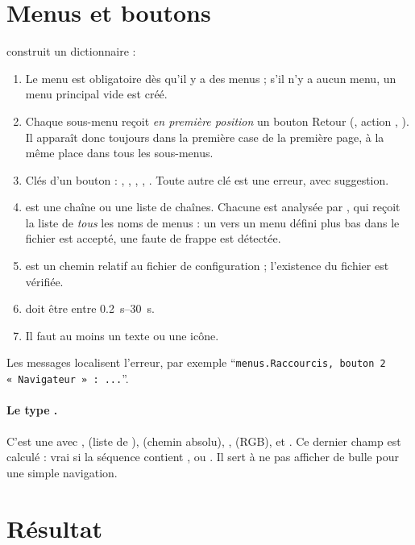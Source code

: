 \section{Menus et boutons}

 construit un dictionnaire  :
\begin{enumerate}
  \item Le menu  est obligatoire dès qu'il y a des menus ; s'il n'y a aucun menu, un menu principal vide est créé.
  \item Chaque sous-menu reçoit \emph{en première position} un bouton Retour (, action , ). Il apparaît donc toujours dans la première case de la première page, à la même place dans tous les sous-menus.
  \item Clés d'un bouton : , , , , . Toute autre clé est une erreur, avec suggestion.
  \item {} est une chaîne ou une liste de chaînes. Chacune est analysée par , qui reçoit la liste de \emph{tous} les noms de menus : un  vers un menu défini plus bas dans le fichier est accepté, une faute de frappe est détectée.
  \item {} est un chemin relatif au fichier de configuration ; l'existence du fichier est vérifiée.
  \item {} doit être entre \qtyrange{0.2}{30}{\second}.
  \item Il faut au moins un texte ou une icône.
\end{enumerate}
Les messages localisent l'erreur, par exemple \enquote{\texttt{menus.Raccourcis, bouton 2 «~Navigateur~» : ...}}.

\paragraph{Le type .} C'est une  avec ,  (liste de ),  (chemin absolu), ,  (RGB),  et . Ce dernier champ est calculé : vrai si la séquence contient ,  ou . Il sert à ne pas afficher de bulle pour une simple navigation.

\section{Résultat}

